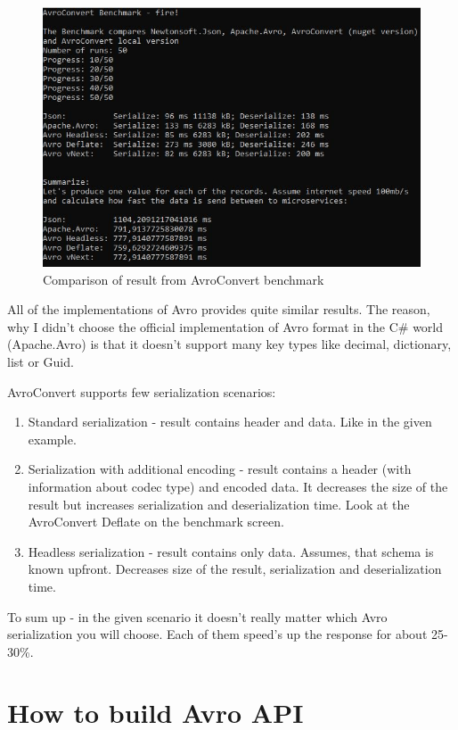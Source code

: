 \documentclass[]{article}
\begin{document}
\begin{figure}[H]
	\centering
	\includegraphics[width=\textwidth]{benchmark}
	\caption{Comparison of result from AvroConvert benchmark}
\end{figure}

All of the implementations of Avro provides quite similar results. The reason, why I didn't choose the official implementation of Avro format in the C\# world (Apache.Avro) is that it doesn't support many key types like decimal, dictionary, list or Guid. 

AvroConvert supports few serialization scenarios:
\begin{enumerate}
	\item Standard serialization - result contains header and data. Like in the given example.
	\item Serialization with additional encoding -  result contains a header (with information about codec type) and encoded data. It decreases the size of the result but increases serialization and deserialization time. Look at the AvroConvert Deflate on the benchmark screen.
	\item Headless serialization  - result contains only data. Assumes, that schema is known upfront. Decreases size of the result, serialization and deserialization time.
\end{enumerate}

To sum up - in the given scenario it doesn't really matter which Avro serialization you will choose. Each of them speed's up the response for about 25-30\%.


\section{How to build Avro API}
\end{document}
